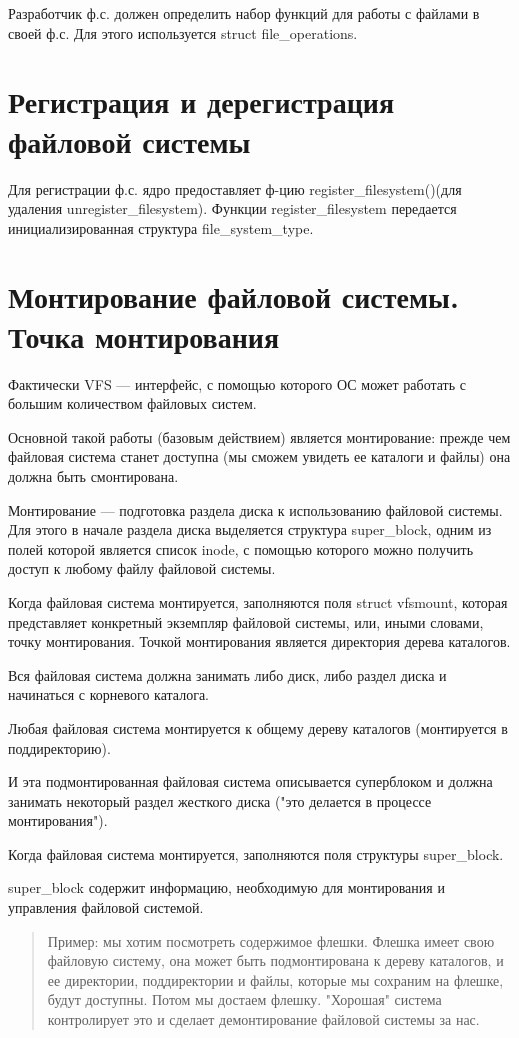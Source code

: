 Разработчик ф.с. должен определить набор функций для работы с файлами в своей ф.с. Для этого используется struct file\_operations.

\section{Регистрация и дерегистрация файловой системы}

Для регистрации ф.с. ядро предоставляет ф-цию register\_filesystem()(для удаления unregister\_filesystem). Функции register\_filesystem передается инициализированная структура file\_system\_type.


\section{Монтирование файловой системы. Точка монтирования}

Фактически VFS — интерфейс, с помощью которого ОС может работать с большим количеством файловых систем.

Основной такой работы (базовым действием) является монтирование: прежде чем файловая система станет доступна (мы сможем увидеть ее каталоги и файлы) она должна быть смонтирована.

Монтирование — подготовка раздела диска к использованию файловой системы. Для этого в начале раздела диска выделяется структура super\_block, одним из полей которой является список inode, с помощью которого можно получить доступ к любому файлу файловой системы.

Когда файловая система монтируется, заполняются поля struct vfsmount, которая представляет конкретный экземпляр файловой системы, или, иными словами, точку монтирования. Точкой монтирования является директория дерева каталогов.

Вся файловая система должна занимать либо диск, либо раздел диска и начинаться с корневого каталога.

Любая файловая система монтируется к общему дереву каталогов (монтируется в поддиректорию).

И эта подмонтированная файловая система описывается суперблоком и должна занимать некоторый раздел жесткого диска ("это делается в процессе монтирования").

Когда файловая система монтируется, заполняются поля структуры super\_block.

super\_block содержит информацию, необходимую для монтирования и управления файловой системой.

\begin{quote}
	Пример: мы хотим посмотреть содержимое флешки. Флешка имеет свою файловую систему, она может быть подмонтирована к дереву каталогов, и ее директории, поддиректории и файлы, которые мы сохраним на флешке, будут доступны. Потом мы достаем флешку. "Хорошая" система контролирует это и сделает демонтирование файловой системы за нас.
\end{quote}

